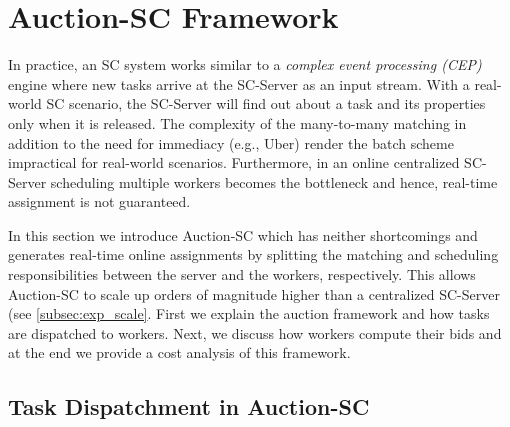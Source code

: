 \section{Auction-SC Framework}
\label{sec:onlinealgo}

In practice, an SC system works similar to a \emph{complex event processing (CEP)} engine \cite{Luckham01} where new tasks arrive at the SC-Server as an input stream. With a real-world SC scenario, the SC-Server will find out about a task and its properties only when it is released. The complexity of the many-to-many matching in addition to the need for immediacy (e.g., Uber) render the batch scheme impractical for real-world scenarios. Furthermore, in an online centralized SC-Server scheduling multiple workers becomes the bottleneck and hence, real-time assignment is not guaranteed.

In this section we introduce Auction-SC which has neither shortcomings and generates real-time online assignments by splitting the matching and scheduling responsibilities between the server and the workers, respectively. This allows Auction-SC to scale up orders of magnitude higher than a centralized SC-Server (see \cref{subsec:exp_scale}. First we explain the auction framework and how tasks are dispatched to workers. Next, we discuss how workers compute their bids and at the end we provide a cost analysis of this framework.

\subsection{Task Dispatchment in Auction-SC}



